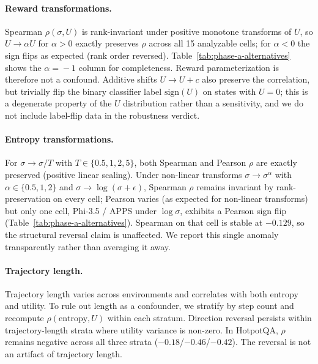 \paragraph{Reward transformations.} Spearman $\rho(\sigma, U)$
is rank-invariant under positive monotone transforms of $U$,
so $U \!\to\! \alpha U$ for $\alpha > 0$ exactly preserves
$\rho$ across all 15 analyzable cells; for $\alpha < 0$ the
sign flips as expected (rank order reversed).
Table~\ref{tab:phase-a-alternatives} shows the $\alpha\!=\!-1$
column for completeness. Reward parameterization is therefore
not a confound. Additive shifts $U \!\to\! U + c$ also preserve
the correlation, but trivially flip the binary classifier label
$\mathrm{sign}(U)$ on states with $U\!=\!0$; this is a
degenerate property of the $U$ distribution rather than a
sensitivity, and we do not include label-flip data in the
robustness verdict.

\paragraph{Entropy transformations.} For $\sigma \!\to\!
\sigma/T$ with $T \in \{0.5, 1, 2, 5\}$, both Spearman and
Pearson $\rho$ are exactly preserved (positive linear scaling).
Under non-linear transforms $\sigma \!\to\! \sigma^\alpha$ with
$\alpha \in \{0.5, 1, 2\}$ and $\sigma \!\to\! \log(\sigma +
\epsilon)$, Spearman $\rho$ remains invariant by rank-preservation
on every cell; Pearson varies (as expected for non-linear
transforms) but only one cell, Phi-3.5 / APPS under
$\log\sigma$, exhibits a Pearson sign flip
(Table~\ref{tab:phase-a-alternatives}). Spearman on that cell
is stable at $-0.129$, so the structural reversal claim is
unaffected. We report this single anomaly transparently rather
than averaging it away.

\paragraph{Trajectory length.}
Trajectory length varies across environments and correlates with
both entropy and utility. To rule out length as a confounder, we
stratify by step count and recompute $\rho(\text{entropy}, U)$
within each stratum. Direction reversal persists within
trajectory-length strata where utility variance is non-zero. In
HotpotQA, $\rho$ remains negative across all three strata
($-0.18$/$-0.46$/$-0.42$). The reversal is not an artifact of
trajectory length.



